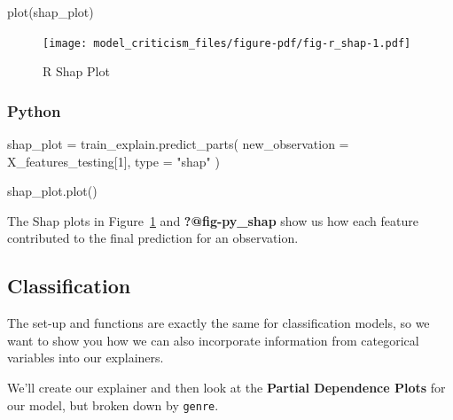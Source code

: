 \documentclass[
  letterpaper,
]{krantz}
\newenvironment{Shaded}{}{}
\newcommand{\BuiltInTok}[1]{\textcolor[rgb]{0.00,0.50,0.00}{#1}}
\newcommand{\DecValTok}[1]{\textcolor[rgb]{0.25,0.63,0.44}{#1}}
\newcommand{\FunctionTok}[1]{\textcolor[rgb]{0.02,0.16,0.49}{#1}}
\newcommand{\NormalTok}[1]{#1}
\newcommand{\OperatorTok}[1]{\textcolor[rgb]{0.40,0.40,0.40}{#1}}
\newcommand{\StringTok}[1]{\textcolor[rgb]{0.25,0.44,0.63}{#1}}
\begin{document}
\begin{Shaded}
\begin{Highlighting}[]
\FunctionTok{plot}\NormalTok{(shap\_plot)}
\end{Highlighting}
\end{Shaded}

\begin{figure}[H]

{\centering \texttt{[image: model\_criticism\_files/figure-pdf/fig-r\_shap-1.pdf]}

}

\caption{\label{fig-r_shap}R Shap Plot}

\end{figure}

\subsubsection{Python}

\begin{Shaded}
\begin{Highlighting}[]
\NormalTok{shap\_plot }\OperatorTok{=}\NormalTok{ train\_explain.predict\_parts(}
\NormalTok{    new\_observation }\OperatorTok{=}\NormalTok{ X\_features\_testing[}\DecValTok{1}\NormalTok{], }
    \BuiltInTok{type} \OperatorTok{=} \StringTok{"shap"}
\NormalTok{)}
\end{Highlighting}
\end{Shaded}

\begin{Shaded}
\begin{Highlighting}[]
\NormalTok{shap\_plot.plot()}
\end{Highlighting}
\end{Shaded}

The Shap plots in Figure~\ref{fig-r_shap} and \textbf{?@fig-py\_shap}
show us how each feature contributed to the final prediction for an
observation.

\subsection{Classification}\label{classification-1}

The set-up and functions are exactly the same for classification models,
so we want to show you how we can also incorporate information from
categorical variables into our explainers.

We'll create our explainer and then look at the \textbf{Partial
Dependence Plots} for our model, but broken down by \texttt{genre}.
\end{document}
